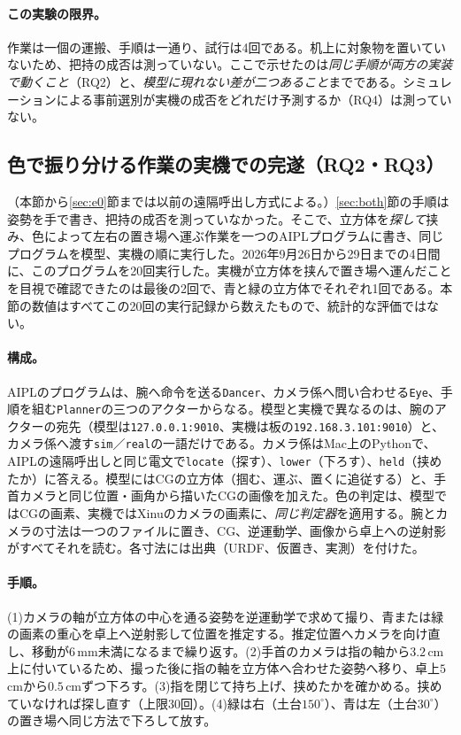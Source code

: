 \documentclass[10pt,letterpaper]{article}
\begin{document}
\paragraph{この実験の限界。}作業は一個の運搬、手順は一通り、試行は4回である。机上に対象物を置いていないため、把持の成否は測っていない。ここで示せたのは\emph{同じ手順が両方の実装で動くこと}（RQ2）と、\emph{模型に現れない差が二つあること}までである。シミュレーションによる事前選別が実機の成否をどれだけ予測するか（RQ4）は測っていない。

\subsection{色で振り分ける作業の実機での完遂（RQ2・RQ3）}\label{sec:sort}
（本節から\ref{sec:e0}節までは以前の遠隔呼出し方式による。）\ref{sec:both}節の手順は姿勢を手で書き、把持の成否を測っていなかった。そこで、立方体を\emph{探して}挟み、色によって左右の置き場へ運ぶ作業を一つのAIPLプログラムに書き、同じプログラムを模型、実機の順に実行した。2026年9月26日から29日までの4日間に、このプログラムを20回実行した。実機が立方体を挟んで置き場へ運んだことを目視で確認できたのは最後の2回で、青と緑の立方体でそれぞれ1回である。本節の数値はすべてこの20回の実行記録から数えたもので、統計的な評価ではない。

\paragraph{構成。}AIPLのプログラムは、腕へ命令を送る\texttt{Dancer}、カメラ係へ問い合わせる\texttt{Eye}、手順を組む\texttt{Planner}の三つのアクターからなる。模型と実機で異なるのは、腕のアクターの宛先（模型は\texttt{127.0.0.1:9010}、実機は板の\texttt{192.168.3.101:9010}）と、カメラ係へ渡す\texttt{sim}／\texttt{real}の一語だけである。カメラ係はMac上のPythonで、AIPLの遠隔呼出しと同じ電文で\texttt{locate}（探す）、\texttt{lower}（下ろす）、\texttt{held}（挟めたか）に答える。模型にはCGの立方体（掴む、運ぶ、置くに追従する）と、手首カメラと同じ位置・画角から描いたCGの画像を加えた。色の判定は、模型ではCGの画素、実機ではXinuのカメラの画素に、\emph{同じ判定器}を適用する。腕とカメラの寸法は一つのファイルに置き、CG、逆運動学、画像から卓上への逆射影がすべてそれを読む。各寸法には出典（URDF、仮置き、実測）を付けた。

\paragraph{手順。}(1)カメラの軸が立方体の中心を通る姿勢を逆運動学で求めて撮り、青または緑の画素の重心を卓上へ逆射影して位置を推定する。推定位置へカメラを向け直し、移動が$6$\,mm未満になるまで繰り返す。(2)手首のカメラは指の軸から$3.2$\,cm上に付いているため、撮った後に指の軸を立方体へ合わせた姿勢へ移り、卓上$5$\,cmから$0.5$\,cmずつ下ろす。(3)指を閉じて持ち上げ、挟めたかを確かめる。挟めていなければ探し直す（上限30回）。(4)緑は右（土台$150^{\circ}$）、青は左（土台$30^{\circ}$）の置き場へ同じ方法で下ろして放す。
\end{document}
